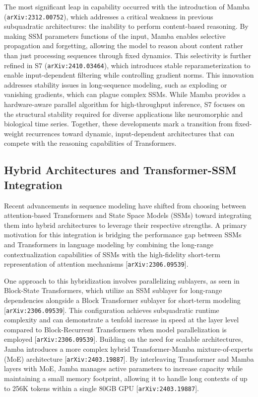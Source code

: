 \documentclass[11pt]{article}
\begin{document}
The most significant leap in capability occurred with the introduction of Mamba (\texttt{arXiv:2312.00752}), which addresses a critical weakness in previous subquadratic architectures: the inability to perform content-based reasoning. By making SSM parameters functions of the input, Mamba enables selective propagation and forgetting, allowing the model to reason about content rather than just processing sequences through fixed dynamics. This selectivity is further refined in S7 (\texttt{arXiv:2410.03464}), which introduces stable reparameterization to enable input-dependent filtering while controlling gradient norms. This innovation addresses stability issues in long-sequence modeling, such as exploding or vanishing gradients, which can plague complex SSMs. While Mamba provides a hardware-aware parallel algorithm for high-throughput inference, S7 focuses on the structural stability required for diverse applications like neuromorphic and biological time series. Together, these developments mark a transition from fixed-weight recurrences toward dynamic, input-dependent architectures that can compete with the reasoning capabilities of Transformers.

\subsection{Hybrid Architectures and Transformer-SSM Integration}

Recent advancements in sequence modeling have shifted from choosing between attention-based Transformers and State Space Models (SSMs) toward integrating them into hybrid architectures to leverage their respective strengths. A primary motivation for this integration is bridging the performance gap between SSMs and Transformers in language modeling by combining the long-range contextualization capabilities of SSMs with the high-fidelity short-term representation of attention mechanisms [\texttt{arXiv:2306.09539}].

One approach to this hybridization involves parallelizing sublayers, as seen in Block-State Transformers, which utilize an SSM sublayer for long-range dependencies alongside a Block Transformer sublayer for short-term modeling [\texttt{arXiv:2306.09539}]. This configuration achieves subquadratic runtime complexity and can demonstrate a tenfold increase in speed at the layer level compared to Block-Recurrent Transformers when model parallelization is employed [\texttt{arXiv:2306.09539}]. Building on the need for scalable architectures, Jamba introduces a more complex hybrid Transformer-Mamba mixture-of-experts (MoE) architecture [\texttt{arXiv:2403.19887}]. By interleaving Transformer and Mamba layers with MoE, Jamba manages active parameters to increase capacity while maintaining a small memory footprint, allowing it to handle long contexts of up to 256K tokens within a single 80GB GPU [\texttt{arXiv:2403.19887}].
\end{document}
